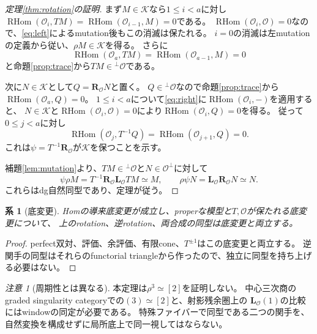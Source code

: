 \documentclass[a4paper,10pt]{ltjsarticle}
\newtheorem{corollary}[theorem]{系}
\theoremstyle{definition}
\theoremstyle{remark}
\newtheorem{remark}[theorem]{注意}
\newcommand{\RHom}{\operatorname{RHom}}
\newcommand{\OO}{\mathcal O}
\newcommand{\cK}{\mathcal K}
\newcommand{\LL}{\mathbf L}
\newcommand{\RR}{\mathbf R}
\begin{document}
\begin{proof}[定理\ref{thm:rotation}の証明]
まず$M\in\cK$なら$1\le i<a$に対し
$\RHom(\OO_i,TM)=\RHom(\OO_{i-1},M)=0$である。
$\RHom(\OO_i,\OO)=0$なので、\eqref{eq:left}によるmutation後もこの消滅は保たれる。
$i=0$の消滅は左mutationの定義から従い、$\rho M\in\cK$を得る。
さらに
\[
 \RHom(\OO_a,TM)=\RHom(\OO_{a-1},M)=0
\]
と命題\ref{prop:trace}から$TM\in{}^\perp\OO$である。

次に$N\in\cK$として$Q=\RR_{\OO}N$と置く。
$Q\in{}^\perp\OO$なので命題\ref{prop:trace}から$\RHom(\OO_a,Q)=0$。
$1\le i<a$について\eqref{eq:right}に$\RHom(\OO_i,-)$を適用すると、
$N\in\cK$と$\RHom(\OO_i,\OO)=0$により$\RHom(\OO_i,Q)=0$を得る。
従って$0\le j<a$に対し
\[
 \RHom(\OO_j,T^{-1}Q)=\RHom(\OO_{j+1},Q)=0.
\]
これは$\psi=T^{-1}\RR_{\OO}$が$\cK$を保つことを示す。

補題\ref{lem:mutation}より、$TM\in{}^\perp\OO$と$N\in\OO^\perp$に対して
\[
 \psi\rho M=T^{-1}\RR_{\OO}\LL_{\OO}TM\simeq M,
 \qquad
 \rho\psi N=\LL_{\OO}\RR_{\OO}N\simeq N.
\]
これらはdg自然同型であり、定理が従う。
\end{proof}

\begin{corollary}[底変更]\label{cor:rotation-bc}
Homの導来底変更が成立し、properな模型と$T,\OO$が保たれる底変更について、
上のrotation、逆rotation、両合成の同型は底変更と両立する。
\end{corollary}
\begin{proof}
perfect双対、評価、余評価、有限cone、$T^{\pm1}$はこの底変更と両立する。
逆関手の同型はそれらのfunctorial triangleから作ったので、独立に同型を持ち上げる必要はない。
\end{proof}

\begin{remark}[周期性とは異なる]
本定理は$\rho^3\simeq[2]$を証明しない。
中心三次商のgraded singularity categoryでの$(3)\simeq[2]$と、射影残余圏上の
$\LL_{\OO}(1)$の比較にはwindowの同定が必要である。
特殊ファイバーで同型である二つの関手を、自然変換を構成せずに局所底上で同一視してはならない。
\end{remark}
\end{document}
